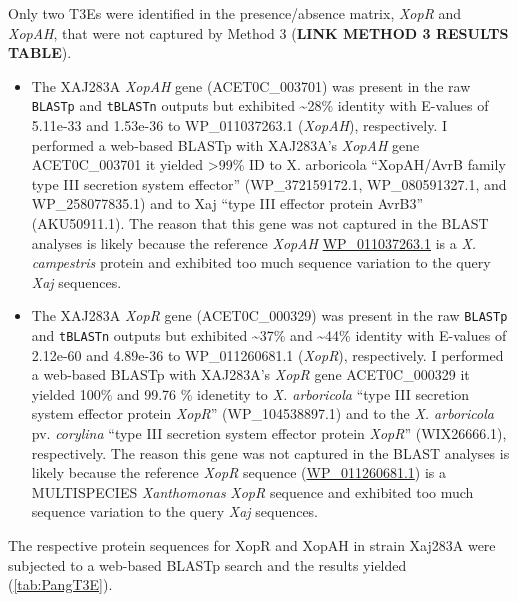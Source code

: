 \documentclass[
]{book}
\begin{document}
Only two T3Es were identified in the presence/absence matrix, \emph{XopR} and \emph{XopAH}, that were not captured by Method 3 (\textbf{LINK METHOD 3 RESULTS TABLE}).

\begin{itemize}
\item
  The XAJ283A \emph{XopAH} gene (ACET0C\_003701) was present in the raw \texttt{BLASTp} and \texttt{tBLASTn} outputs but exhibited \textasciitilde28\% identity with E-values of 5.11e-33 and 1.53e-36 to WP\_011037263.1 (\emph{XopAH}), respectively. I performed a web-based BLASTp with XAJ283A's \emph{XopAH} gene ACET0C\_003701 it yielded \textgreater99\% ID to X. arboricola ``XopAH/AvrB family type III secretion system effector'' (WP\_372159172.1, WP\_080591327.1, and WP\_258077835.1) and to Xaj ``type III effector protein AvrB3'' (AKU50911.1). The reason that this gene was not captured in the BLAST analyses is likely because the reference \emph{XopAH} \href{https://www.ncbi.nlm.nih.gov/protein/WP_011037263.1}{WP\_011037263.1} is a \emph{X. campestris} protein and exhibited too much sequence variation to the query \emph{Xaj} sequences.
\item
  The XAJ283A \emph{XopR} gene (ACET0C\_000329) was present in the raw \texttt{BLASTp} and \texttt{tBLASTn} outputs but exhibited \textasciitilde37\% and \textasciitilde44\% identity with E-values of 2.12e-60 and 4.89e-36 to WP\_011260681.1 (\emph{XopR}), respectively. I performed a web-based BLASTp with XAJ283A's \emph{XopR} gene ACET0C\_000329 it yielded 100\% and 99.76 \% idenetity to \emph{X. arboricola} ``type III secretion system effector protein \emph{XopR}'' (WP\_104538897.1) and to the \emph{X. arboricola} pv. \emph{corylina} ``type III secretion system effector protein \emph{XopR}'' (WIX26666.1), respectively. The reason this gene was not captured in the BLAST analyses is likely because the reference \emph{XopR} sequence (\href{https://www.ncbi.nlm.nih.gov/protein/WP_011260681.1}{WP\_011260681.1}) is a MULTISPECIES \emph{Xanthomonas} \emph{XopR} sequence and exhibited too much sequence variation to the query \emph{Xaj} sequences.
\end{itemize}

The respective protein sequences for XopR and XopAH in strain Xaj283A were subjected to a web-based BLASTp search and the results yielded (\ref{tab:PangT3E}).
\end{document}
